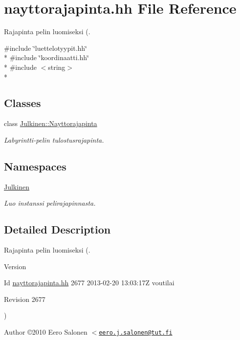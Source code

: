 \hypertarget{nayttorajapinta_8hh}{}\section{nayttorajapinta.\+hh File Reference}
\label{nayttorajapinta_8hh}


Rajapinta pelin luomiseksi (.  


{\ttfamily \#include \char`\"{}luettelotyypit.\+hh\char`\"{}}\\*
{\ttfamily \#include \char`\"{}koordinaatti.\+hh\char`\"{}}\\*
{\ttfamily \#include $<$string$>$}\\*
\subsection*{Classes}
\begin{DoxyCompactItemize}
\item 
class \hyperlink{class_julkinen_1_1_nayttorajapinta}{Julkinen\+::\+Nayttorajapinta}
\begin{DoxyCompactList}\small\item\em Labyrintti-\/pelin tulostusrajapinta. \end{DoxyCompactList}\end{DoxyCompactItemize}
\subsection*{Namespaces}
\begin{DoxyCompactItemize}
\item 
 \hyperlink{namespace_julkinen}{Julkinen}
\begin{DoxyCompactList}\small\item\em Luo instanssi pelirajapinnasta. \end{DoxyCompactList}\end{DoxyCompactItemize}


\subsection{Detailed Description}
Rajapinta pelin luomiseksi (. 

\begin{DoxyVersion}{Version}

\end{DoxyVersion}
\begin{DoxyParagraph}{Id}
\hyperlink{nayttorajapinta_8hh}{nayttorajapinta.\+hh} 2677 2013-\/02-\/20 13\+:03\+:17\+Z voutilai 
\end{DoxyParagraph}


\begin{DoxyParagraph}{Revision}
2677 
\end{DoxyParagraph}
) \begin{DoxyAuthor}{Author}
©2010 Eero Salonen $<$\href{mailto:eero.j.salonen@tut.fi}{\tt eero.\+j.\+salonen@tut.\+fi} 
\end{DoxyAuthor}
